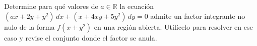 Determine para qué valores de $a\in\mathbb R$ la ecuación $(ax+2y+y^2)\,dx+(x+4xy+5y^2)\,dy=0$ admite un factor integrante no nulo de la forma $f(x+y^2)$ en una región abierta. Utilícelo para resolver en ese caso y revise el conjunto donde el factor se anula.
